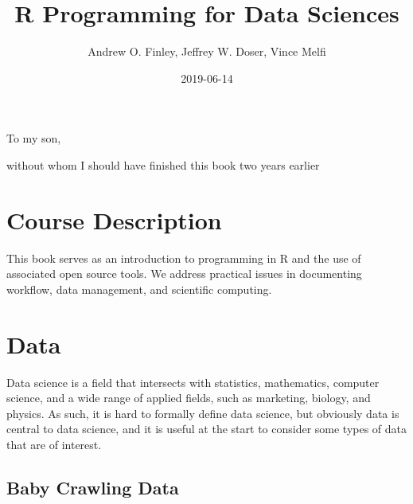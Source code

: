 \documentclass[]{krantz}
\title{R Programming for Data Sciences}
\author{Andrew O. Finley, Jeffrey W. Doser, Vince Melfi}
\date{2019-06-14}
\begin{document}
\maketitle


\thispagestyle{empty}

\begin{center}
To my son,

without whom I should have finished this book two years earlier
\end{center}

\setlength{\abovedisplayskip}{-5pt}
\setlength{\abovedisplayshortskip}{-5pt}

{
\hypersetup{linkcolor=black}
\setcounter{tocdepth}{2}
\tableofcontents
}
\listoftables
\listoffigures
\chapter*{Course Description}\label{course-description}


This book serves as an introduction to programming in R and the use of
associated open source tools. We address practical issues in documenting
workflow, data management, and scientific computing.

\mainmatter

\chapter{Data}\label{data}

Data science is a field that intersects with statistics, mathematics,
computer science, and a wide range of applied fields, such as marketing,
biology, and physics. As such, it is hard to formally define data
science, but obviously data is central to data science, and it is useful
at the start to consider some types of data that are of interest.

\section{Baby Crawling Data}\label{baby-crawling-data}
\end{document}
